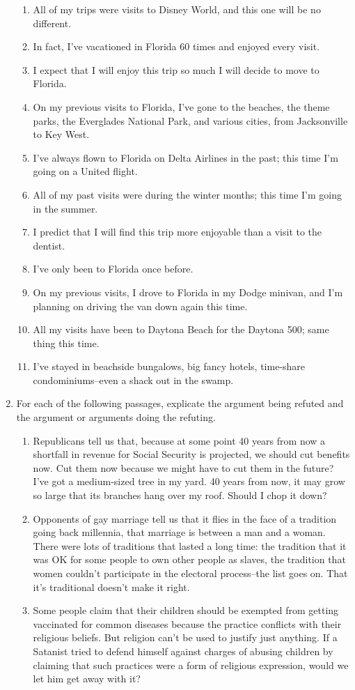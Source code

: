 \begin{enumerate}
\begin{enumerate}
\item All of my trips were visits to Disney World, and this one will be no different.
\item In fact, I've vacationed in Florida 60 times and enjoyed every visit.
\item I expect that I will enjoy this trip so much I will decide to move to Florida.
\item On my previous visits to Florida, I've gone to the beaches, the theme parks, the
Everglades National Park, and various cities, from Jacksonville to Key West.
\item I've always flown to Florida on Delta Airlines in the past; this time I'm going on a
United flight.
\item All of my past visits were during the winter months; this time I'm going in the summer.
\item I predict that I will find this trip more enjoyable than a visit to the dentist.
\item I've only been to Florida once before.
\item On my previous visits, I drove to Florida in my Dodge minivan, and I'm planning on
driving the van down again this time.
\item All my visits have been to Daytona Beach for the Daytona 500; same thing this time.
\item I've stayed in beachside bungalows, big fancy hotels, time-share condominiums--even
a shack out in the swamp.
\end{enumerate}
\item For each of the following passages, explicate the argument being refuted and the argument or
arguments doing the refuting.
\begin{enumerate}
\item Republicans tell us that, because at some point 40 years from now a shortfall in revenue
for Social Security is projected, we should cut benefits now. Cut them now because we
might have to cut them in the future? I've got a medium-sized tree in my yard. 40 years
from now, it may grow so large that its branches hang over my roof. Should I chop it down?
\item Opponents of gay marriage tell us that it flies in the face of a tradition going back
millennia, that marriage is between a man and a woman. There were lots of traditions that
lasted a long time: the tradition that it was OK for some people to own other people as
slaves, the tradition that women couldn't participate in the electoral process--the list goes
on. That it's traditional doesn't make it right.
\item Some people claim that their children should be exempted from getting vaccinated for
common diseases because the practice conflicts with their religious beliefs. But religion
can't be used to justify just anything. If a Satanist tried to defend himself against charges
of abusing children by claiming that such practices were a form of religious expression,
would we let him get away with it?
\end{enumerate}
\end{enumerate}
